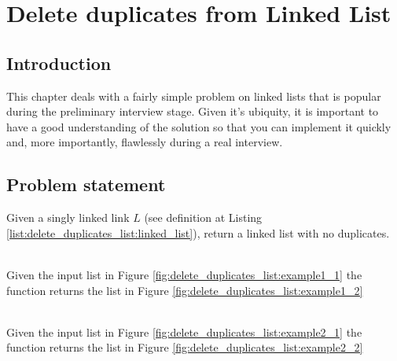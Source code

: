 %

\chapter{Delete duplicates from Linked List}
\label{ch:delete_duplicates_list}
\section*{Introduction}
This chapter deals with a fairly simple problem on linked lists that is popular during the preliminary interview stage. Given it's ubiquity, it is important to have a good understanding of the solution so that you can implement it quickly and, more importantly, flawlessly during a real interview. 
\section{Problem statement}
\begin{exercise}
Given a singly linked link $L$ (see definition at Listing \ref{list:delete_duplicates_list:linked_list}), return a linked list with no duplicates.

	\begin{example}
		\label{ex:delete_duplicates_list:example1}
		\hfill \\
		Given the input list in Figure \ref{fig:delete_duplicates_list:example1_1} the function returns the list in Figure \ref{fig:delete_duplicates_list:example1_2} 
	\end{example}

	\begin{example}
		\hfill \\
		\label{ex:delete_duplicates_list:example2}
		Given the input list in Figure \ref{fig:delete_duplicates_list:example2_1} the function returns the list in Figure \ref{fig:delete_duplicates_list:example2_2} 
	\end{example}
\end{exercise}

